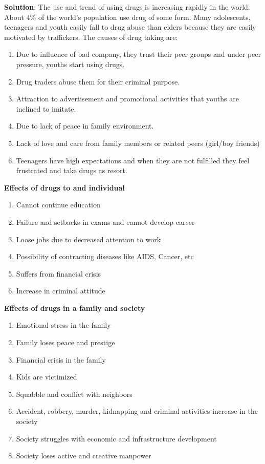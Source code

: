\documentclass[
  openany]{book}
\newenvironment{solution}{ {\bfseries Solution}:}{}
\begin{document}
\begin{questions}
\begin{solution}
The use and trend of using drugs is increasing rapidly in the world. About 4\% of the world's population use drug of some form. Many adolescents, teenagers and youth easily fall to drug abuse than elders because they are easily motivated by traffickers. The causes of drug taking are:
\begin{enumerate}
\item Due to influence of bad company, they trust their peer groups and under peer pressure, youths start using drugs.
\item Drug traders abuse them for their criminal purpose.
\item Attraction to advertisement and promotional activities that youths are inclined to imitate.
\item Due to lack of peace in family environment.
\item Lack of love and care from family members or related peers (girl/boy friends)
\item Teenagers have high expectations and when they are not fulfilled they feel frustrated and take drugs as resort.
\end{enumerate}

\textbf{Effects of drugs to and individual}
\begin{enumerate}
\item Cannot continue education
\item Failure and setbacks in exams and cannot develop career
\item Loose jobs due to decreased attention to work
\item Possibility of contracting diseases like AIDS, Cancer, etc
\item Suffers from financial crisis
\item Increase in criminal attitude
\end{enumerate}

\textbf{Effects of drugs in a family and society}
\begin{enumerate}
\item Emotional stress in the family
\item Family loses peace and prestige
\item Financial crisis in the family
\item Kids are victimized
\item Squabble and conflict with neighbors
\item Accident, robbery, murder, kidnapping and criminal activities increase in the society
\item Society struggles with economic and infrastructure development
\item Society loses active and creative manpower
\end{enumerate}


\end{solution}
\end{questions}
\end{document}
